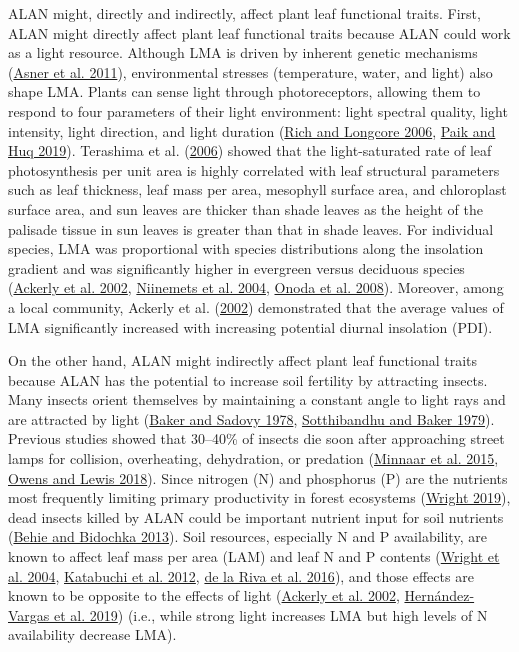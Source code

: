 \documentclass[
  12pt,
  letterpaper,
  DIV=11,
  numbers=noendperiod]{scrartcl}
\begin{document}
ALAN might, directly and indirectly, affect plant leaf functional
traits. First, ALAN might directly affect plant leaf functional traits
because ALAN could work as a light resource. Although LMA is driven by
inherent genetic mechanisms (\protect\hyperlink{ref-Asner2011}{Asner et
al. 2011}), environmental stresses (temperature, water, and light) also
shape LMA. Plants can sense light through photoreceptors, allowing them
to respond to four parameters of their light environment: light spectral
quality, light intensity, light direction, and light duration
(\protect\hyperlink{ref-Rich2006}{Rich and Longcore 2006},
\protect\hyperlink{ref-Paik2019}{Paik and Huq 2019}). Terashima et al.
(\protect\hyperlink{ref-Terashima2006}{2006}) showed that the
light-saturated rate of leaf photosynthesis per unit area is highly
correlated with leaf structural parameters such as leaf thickness, leaf
mass per area, mesophyll surface area, and chloroplast surface area, and
sun leaves are thicker than shade leaves as the height of the palisade
tissue in sun leaves is greater than that in shade leaves. For
individual species, LMA was proportional with species distributions
along the insolation gradient and was significantly higher in evergreen
versus deciduous species (\protect\hyperlink{ref-Ackerly2002}{Ackerly et
al. 2002}, \protect\hyperlink{ref-Niinemets2004}{Niinemets et al. 2004},
\protect\hyperlink{ref-Onoda2008}{Onoda et al. 2008}). Moreover, among a
local community, Ackerly et al.
(\protect\hyperlink{ref-Ackerly2002}{2002}) demonstrated that the
average values of LMA significantly increased with increasing potential
diurnal insolation (PDI).

On the other hand, ALAN might indirectly affect plant leaf functional
traits because ALAN has the potential to increase soil fertility by
attracting insects. Many insects orient themselves by maintaining a
constant angle to light rays and are attracted by light
(\protect\hyperlink{ref-Baker1978}{Baker and Sadovy 1978},
\protect\hyperlink{ref-Sotthibandhu1979}{Sotthibandhu and Baker 1979}).
Previous studies showed that 30--40\% of insects die soon after
approaching street lamps for collision, overheating, dehydration, or
predation (\protect\hyperlink{ref-Minnaar2015}{Minnaar et al. 2015},
\protect\hyperlink{ref-Owens2018}{Owens and Lewis 2018}). Since nitrogen
(N) and phosphorus (P) are the nutrients most frequently limiting
primary productivity in forest ecosystems
(\protect\hyperlink{ref-Wright2019}{Wright 2019}), dead insects killed
by ALAN could be important nutrient input for soil nutrients
(\protect\hyperlink{ref-Behie2013}{Behie and Bidochka 2013}). Soil
resources, especially N and P availability, are known to affect leaf
mass per area (LAM) and leaf N and P contents
(\protect\hyperlink{ref-Wright2004}{Wright et al. 2004},
\protect\hyperlink{ref-Katabuchi2012}{Katabuchi et al. 2012},
\protect\hyperlink{ref-Riva2016}{de la Riva et al. 2016}), and those
effects are known to be opposite to the effects of light
(\protect\hyperlink{ref-Ackerly2002}{Ackerly et al. 2002},
\protect\hyperlink{ref-Hernandez-Vargas2019}{Hernández-Vargas et al.
2019}) (i.e., while strong light increases LMA but high levels of N
availability decrease LMA).
\end{document}
